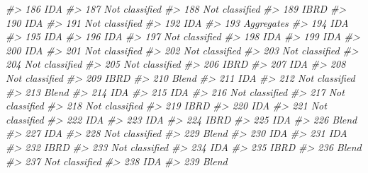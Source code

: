 \documentclass[
  xelatex, ja=standard]{bxjsbook}
\newenvironment{Shaded}{\begin{snugshade}}{\end{snugshade}}
\newcommand{\CommentTok}[1]{\textcolor[rgb]{0.56,0.35,0.01}{\textit{#1}}}
\theoremstyle{definition}
\theoremstyle{definition}
\theoremstyle{definition}
\theoremstyle{definition}
\theoremstyle{remark}
\begin{document}
\begin{Shaded}
\begin{Highlighting}[]
\CommentTok{\#\textgreater{} 186            IDA}
\CommentTok{\#\textgreater{} 187 Not classified}
\CommentTok{\#\textgreater{} 188 Not classified}
\CommentTok{\#\textgreater{} 189           IBRD}
\CommentTok{\#\textgreater{} 190            IDA}
\CommentTok{\#\textgreater{} 191 Not classified}
\CommentTok{\#\textgreater{} 192            IDA}
\CommentTok{\#\textgreater{} 193     Aggregates}
\CommentTok{\#\textgreater{} 194            IDA}
\CommentTok{\#\textgreater{} 195            IDA}
\CommentTok{\#\textgreater{} 196            IDA}
\CommentTok{\#\textgreater{} 197 Not classified}
\CommentTok{\#\textgreater{} 198            IDA}
\CommentTok{\#\textgreater{} 199            IDA}
\CommentTok{\#\textgreater{} 200            IDA}
\CommentTok{\#\textgreater{} 201 Not classified}
\CommentTok{\#\textgreater{} 202 Not classified}
\CommentTok{\#\textgreater{} 203 Not classified}
\CommentTok{\#\textgreater{} 204 Not classified}
\CommentTok{\#\textgreater{} 205 Not classified}
\CommentTok{\#\textgreater{} 206           IBRD}
\CommentTok{\#\textgreater{} 207            IDA}
\CommentTok{\#\textgreater{} 208 Not classified}
\CommentTok{\#\textgreater{} 209           IBRD}
\CommentTok{\#\textgreater{} 210          Blend}
\CommentTok{\#\textgreater{} 211            IDA}
\CommentTok{\#\textgreater{} 212 Not classified}
\CommentTok{\#\textgreater{} 213          Blend}
\CommentTok{\#\textgreater{} 214            IDA}
\CommentTok{\#\textgreater{} 215            IDA}
\CommentTok{\#\textgreater{} 216 Not classified}
\CommentTok{\#\textgreater{} 217 Not classified}
\CommentTok{\#\textgreater{} 218 Not classified}
\CommentTok{\#\textgreater{} 219           IBRD}
\CommentTok{\#\textgreater{} 220            IDA}
\CommentTok{\#\textgreater{} 221 Not classified}
\CommentTok{\#\textgreater{} 222            IDA}
\CommentTok{\#\textgreater{} 223            IDA}
\CommentTok{\#\textgreater{} 224           IBRD}
\CommentTok{\#\textgreater{} 225            IDA}
\CommentTok{\#\textgreater{} 226          Blend}
\CommentTok{\#\textgreater{} 227            IDA}
\CommentTok{\#\textgreater{} 228 Not classified}
\CommentTok{\#\textgreater{} 229          Blend}
\CommentTok{\#\textgreater{} 230            IDA}
\CommentTok{\#\textgreater{} 231            IDA}
\CommentTok{\#\textgreater{} 232           IBRD}
\CommentTok{\#\textgreater{} 233 Not classified}
\CommentTok{\#\textgreater{} 234            IDA}
\CommentTok{\#\textgreater{} 235           IBRD}
\CommentTok{\#\textgreater{} 236          Blend}
\CommentTok{\#\textgreater{} 237 Not classified}
\CommentTok{\#\textgreater{} 238            IDA}
\CommentTok{\#\textgreater{} 239          Blend}

\end{Highlighting}
\end{Shaded}
\end{document}
